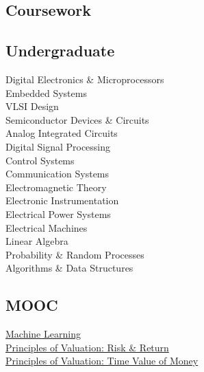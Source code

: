 \documentclass[]{deedy}
\begin{document}
\begin{minipage}[t]{0.25\textwidth} 
\begin{flushleft}
%
\section{Coursework}
\subsection{Undergraduate}
Digital Electronics \& Microprocessors \\
\vspace{1pt}
Embedded Systems \\
\vspace{1pt}
VLSI Design \\
\vspace{1pt}
Semiconductor Devices \& Circuits \\
\vspace{1pt}
Analog Integrated Circuits \\
\vspace{1pt}
Digital Signal Processing \\
\vspace{1pt}
Control Systems \\
\vspace{1pt}
Communication Systems \\
\vspace{1pt}
Electromagnetic Theory \\
\vspace{1pt}
Electronic Instrumentation \\
\vspace{1pt}
Electrical Power Systems \\
\vspace{1pt}
Electrical Machines \\
\vspace{1pt}
Linear Algebra \\
\vspace{1pt}
Probability \& Random Processes \\
\vspace{1pt}
Algorithms \& Data Structures \\
\vspace{1pt}
\sectionsep
%
\subsection{MOOC}
\href{https://www.coursera.org/account/accomplishments/certificate/7V2KZSKAL7ZJ}{Machine Learning} \\
\vspace{1pt}
\href{https://www.coursera.org/account/accomplishments/certificate/98ZD8GFQ8BMS}{Principles of Valuation: Risk \& Return} \\
\vspace{1pt}
\href{https://www.coursera.org/account/accomplishments/certificate/P637RR9C8B7T}{Principles of Valuation: Time Value of Money} \\
%
\end{flushleft}
\end{minipage}
\end{document}
